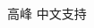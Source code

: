 \documentclass{beamer}
\begin{document}
\begin{CJK*}{UTF8}{gbsn}

  \begin{frame}{高峰}
    中文支持
  \end{frame}
\end{CJK*}
\end{document}

